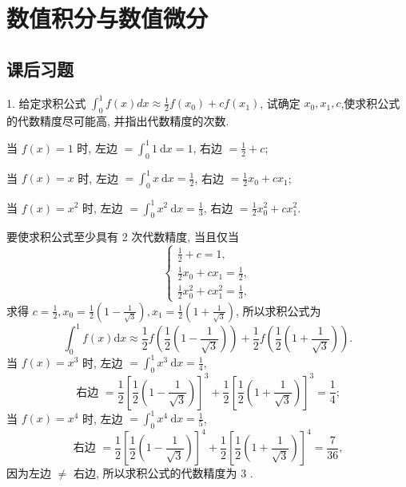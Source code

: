 \newpage
\section{数值积分与数值微分}
\subsection{课后习题}
\begin{tcolorbox}[breakable,enhanced,arc=0mm,outer arc=0mm,
		boxrule=0pt,toprule=1pt,leftrule=0pt,bottomrule=1pt, rightrule=0pt,left=0.2cm,right=0.2cm,
		titlerule=0.5em,toptitle=0.1cm,bottomtitle=-0.1cm,top=0.2cm,
		colframe=white!10!biru,colback=white!90!biru,coltitle=white,
            coltext=black,title =2024-05, title style={white!10!biru}, before skip=8pt, after skip=8pt,before upper=\hspace{2em},
		fonttitle=\bfseries,fontupper=\normalsize]

 1. 给定求积公式 $ \displaystyle\int_{0}^{1} f(x) d x \approx \frac{1}{2} f\left(x_{0}\right)+c f\left(x_{1}\right) $, 试确定 $ x_{0}, x_{1}, c $,使求积公式的代数精度尽可能高, 并指出代数精度的次数.

 \tcblower
  当 $ f(x)=1 $ 时, 左边 $ =\int_{0}^{1} 1 \mathrm{~d} x=1 $, 右边 $ =\frac{1}{2}+c $;
  
  当 $ f(x)=x $ 时, 左边 $ =\int_{0}^{1} x \mathrm{~d} x=\frac{1}{2} $, 右边 $ =\frac{1}{2} x_{0}+c x_{1} $;
  
  当 $ f(x)=x^{2} $ 时, 左边 $ =\int_{0}^{1} x^{2} \mathrm{~d} x=\frac{1}{3} $, 右边 $ =\frac{1}{2} x_{0}^{2}+c x_{1}^{2} $.
  
  要使求积公式至少具有 2 次代数精度, 当且仅当
$$
\left\{\begin{array}{l}
\frac{1}{2}+c=1, \\
\frac{1}{2} x_{0}+c x_{1}=\frac{1}{2}, \\
\frac{1}{2} x_{0}^{2}+c x_{1}^{2}=\frac{1}{3},
\end{array}\right.
$$
求得 $ c=\frac{1}{2}, x_{0}=\frac{1}{2}\left(1-\frac{1}{\sqrt{3}}\right), x_{1}=\frac{1}{2}\left(1+\frac{1}{\sqrt{3}}\right) $, 所以求积公式为
$$
\int_{0}^{1} f(x) \mathrm{d} x \approx \frac{1}{2} f\left(\frac{1}{2}\left(1-\frac{1}{\sqrt{3}}\right)\right)+\frac{1}{2} f\left(\frac{1}{2}\left(1+\frac{1}{\sqrt{3}}\right)\right) .
$$
当 $ f(x)=x^{3} $ 时, 左边 $ =\int_{0}^{1} x^{3} \mathrm{~d} x=\frac{1}{4} $,
$$
\text { 右边 }=\frac{1}{2}\left[\frac{1}{2}\left(1-\frac{1}{\sqrt{3}}\right)\right]^{3}+\frac{1}{2}\left[\frac{1}{2}\left(1+\frac{1}{\sqrt{3}}\right)\right]^{3}=\frac{1}{4} \text {; }
$$
当 $ f(x)=x^{4} $ 时, 左边 $ =\int_{0}^{1} x^{4} \mathrm{~d} x=\frac{1}{5} $,
$$
\text { 右边 }=\frac{1}{2}\left[\frac{1}{2}\left(1-\frac{1}{\sqrt{3}}\right)\right]^{4}+\frac{1}{2}\left[\frac{1}{2}\left(1+\frac{1}{\sqrt{3}}\right)\right]^{4}=\frac{7}{36} \text {, }
$$
因为左边 $ \neq $ 右边, 所以求积公式的代数精度为 3 .
\end{tcolorbox}

